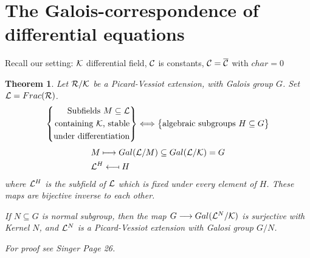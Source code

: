 \documentclass[11pt]{article}
\newtheorem{thm}{Theorem}[section]
\newcommand{\calc}{{\cal C}}
\newcommand{\calk}{{\cal K}}
\newcommand{\call}{{\cal L}}
\newcommand{\calr}{{\cal R}}
\newcommand{\lrta}{\longrightarrow}
\begin{document}
\section{The Galois-correspondence of differential equations}
Recall our setting: $\calk$ differential field, $\calc$ is constants, $\calc=\overline{\calc}$ with $char =0$
\begin{thm}
Let $\calr/\calk$ be a Picard-Vessiot extension, with Galois group $G$. Set $\call=Frac(\calr)$. 
$$
\left\{
\begin{aligned}
\text{Subfields $M\subseteq \call$}\\
\text{containing $\calk$, stable}\\
\text{under differentiation}
\end{aligned}
\right\}
\Longleftrightarrow
\left\{
\begin{aligned}
\text{algebraic subgroups  $H\subseteq G$}\\
\end{aligned}
\right\}
$$
$$
\begin{aligned}
&M\longmapsto Gal(\call/M)\subseteq Gal(\call/\calk)=G\\
&\call^H\longmapsfrom H
\end{aligned}
$$
where $\call^H$ is the subfield of $\call$ which is fixed under every element of $H$.
These maps are bijective inverse to each other.

If $N\subseteq G$ is normal subgroup, then the map $G\lrta Gal(\call^N/\calk)$ is surjective with Kernel $N$, and $\call^N$ is a Picard-Vessiot extension with Galosi group $G/N$.

For proof see Singer Page 26.
\end{thm}
\end{document}
